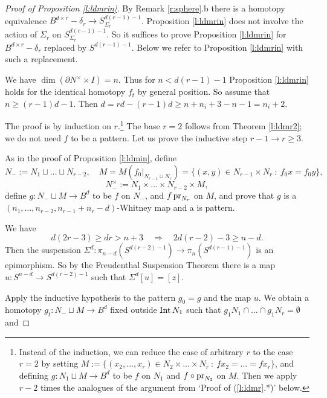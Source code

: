 \documentclass[12pt]{article}
\newcommand{\aronly}[1]{#1}
\def\pr{\mathop{\fam0 pr}}
\def\diag{\delta}
\def\Int{\mathop{\fam0 Int}}
\theoremstyle{plain}
\theoremstyle{definition}
\begin{document}
\begin{proof}[Proof of Proposition \ref{l:ldmrin}]
By Remark \ref{r:sphere}.b there is a homotopy equivalence $B^{d\times r}-\diag_r\to S^{d(r-1)-1}_{\Sigma_r}$.
Proposition \ref{l:ldmrin} does not involve the action of $\Sigma_r$ on $S^{d(r-1)-1}_{\Sigma_r}$.
So it suffices to prove Proposition \ref{l:ldmrin} for $B^{d\times r}-\diag_r$ replaced by $S^{d(r-1)-1}$.
Below we refer to Proposition \ref{l:ldmrin} with such a replacement.

We have $\dim(\partial N^\times\times I)=n$.
Thus for $n<d(r-1)-1$ Proposition \ref{l:ldmrin} holds for the identical homotopy $f_t$ by general position.
So assume that $n\ge(r-1)d-1$.
Then $d=rd-(r-1)d\ge n+n_i+3-n-1=n_i+2$.

The proof is by induction on $r$.\aronly{\footnote{Instead of the induction, we can reduce the case of arbitrary $r$ to the case $r=2$ by setting $M:=\{(x_2,\ldots,x_r)\in N_2\times\ldots\times N_r\ :\ fx_2=\ldots=fx_r\}$, and
defining $g:N_1\sqcup M\to B^d$ to be $f$ on $N_1$ and $f\circ\pr_{N_2}$ on $M$.
Then we apply $r-2$ times the analogues of the argument from `Proof of (\ref{l:ldmr}.*)'
below.}}
The base $r=2$ follows from Theorem \ref{l:ldmr2}; we do not need $f$ to be a pattern.
Let us prove the inductive step $r-1\to r\ge3$.

As in the proof of Proposition \ref{l:ldmin}, define
$$N_-:=N_1\sqcup\ldots\sqcup N_{r-2},\quad
M=M(f_0|_{N_{r-1}\sqcup N_r})=\{(x,y)\in N_{r-1}\times N_r\ :\ f_0x=f_0y\},$$
$$N^\times_-:=N_1\times\ldots\times N_{r-2}\times M,$$
define $g:N_-\sqcup M\to B^d$ to be $f$ on $N_-$, and $f\pr_{N_r}$ on $M$,
and prove that $g$ is a $(n_1,\ldots,n_{r-2},n_{r-1}+n_r-d)$-Whitney map and a is pattern.


We have
$$d(2r-3)\ge dr>n+3 \quad\Rightarrow\quad 2d(r-2)-3\ge n-d.$$
Then the suspension $\Sigma^d:\pi_{n-d}(S^{d(r-2)-1})\to \pi_n(S^{d(r-1)-1})$ is an epimorphism.
So by the Freudenthal Suspension Theorem there is a map $u:S^{n-d}\to S^{d(r-2)-1}$ such that $\Sigma^d[u]=[z]$.

Apply the inductive hypothesis to the pattern $g_0=g$ and the map $u$.
We obtain a homotopy $g_t:N_-\sqcup M\to B^d$ fixed outside $\Int N_1$ such that
$g_1N_1\cap\ldots\cap g_1N_r=\emptyset$ and


\end{proof}
\end{document}
